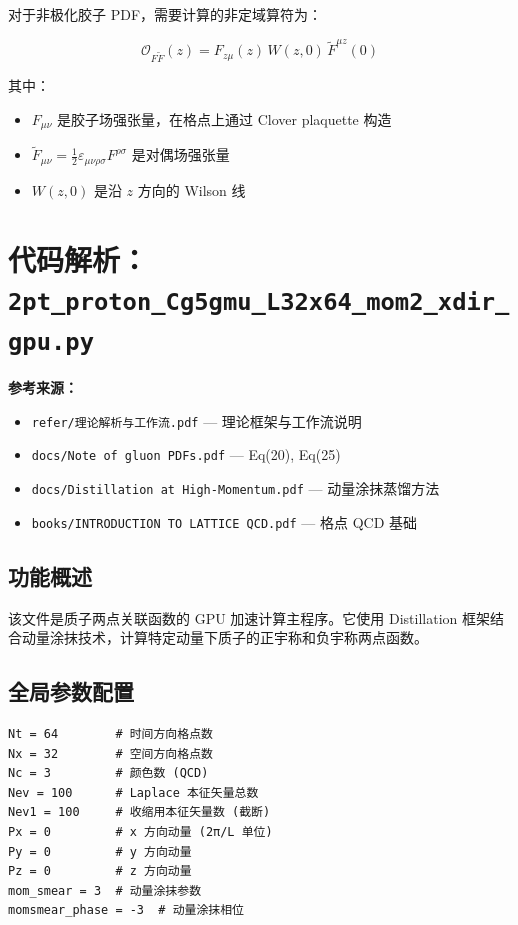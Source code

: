 \documentclass[12pt,a4paper]{ctexart}
\begin{document}
对于非极化胶子 PDF，需要计算的非定域算符为：

\begin{equation}
\mathcal{O}_{F\tilde{F}}(z) = F_{z\mu}(z) \, W(z, 0) \, \tilde{F}^{\mu z}(0)
\end{equation}

其中：
\begin{itemize}
    \item $F_{\mu\nu}$ 是胶子场强张量，在格点上通过 Clover plaquette 构造
    \item $\tilde{F}_{\mu\nu} = \frac{1}{2}\varepsilon_{\mu\nu\rho\sigma}F^{\rho\sigma}$ 是对偶场强张量
    \item $W(z, 0)$ 是沿 $z$ 方向的 Wilson 线
\end{itemize}

\section{代码解析：\texttt{2pt\_proton\_Cg5gmu\_L32x64\_mom2\_xdir\_gpu.py}}
\label{sec:2pt}

\textbf{参考来源：}
\begin{itemize}
    \item \texttt{refer/理论解析与工作流.pdf} — 理论框架与工作流说明
    \item \texttt{docs/Note of gluon PDFs.pdf} — Eq(20), Eq(25)
    \item \texttt{docs/Distillation at High-Momentum.pdf} — 动量涂抹蒸馏方法
    \item \texttt{books/INTRODUCTION TO LATTICE QCD.pdf} — 格点 QCD 基础
\end{itemize}

\subsection{功能概述}

该文件是质子两点关联函数的 GPU 加速计算主程序。它使用 Distillation 框架结合动量涂抹技术，计算特定动量下质子的正宇称和负宇称两点函数。

\subsection{全局参数配置}

\begin{lstlisting}[caption={全局参数配置}]
Nt = 64        # 时间方向格点数
Nx = 32        # 空间方向格点数
Nc = 3         # 颜色数 (QCD)
Nev = 100      # Laplace 本征矢量总数
Nev1 = 100     # 收缩用本征矢量数 (截断)
Px = 0         # x 方向动量 (2π/L 单位)
Py = 0         # y 方向动量
Pz = 0         # z 方向动量
mom_smear = 3  # 动量涂抹参数
momsmear_phase = -3  # 动量涂抹相位
\end{lstlisting}
\end{document}
